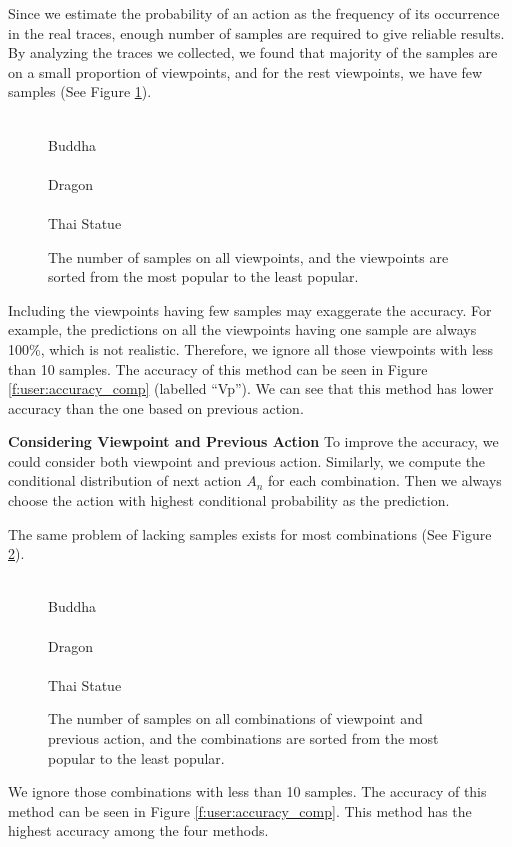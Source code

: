 Since we estimate the probability of an action as the frequency 
of its occurrence in the real traces, 
enough number of samples are required to give reliable results. 
By analyzing the traces we collected, we found that majority of the samples are 
on a small proportion of viewpoints, and for the rest viewpoints, we have few
samples (See Figure \ref{f:user:sample_size_1}).
\begin{figure}
    \centering
    \\
    Buddha\\
    \\
    Dragon\\
    \\
    Thai Statue
    \caption{The number of samples on all viewpoints, and the viewpoints are sorted from the most popular to the least popular.}
    \label{f:user:sample_size_1}
\end{figure}
Including the viewpoints having few samples may exaggerate the accuracy.
For example, the predictions on all the viewpoints having one sample are 
always 100\%, which is not realistic.
Therefore, we ignore all those viewpoints with less than 10 samples.
The accuracy of this method can be seen in Figure \ref{f:user:accuracy_comp} (labelled ``Vp'').
We can see that this method has lower accuracy than the one based on previous action.

\textbf{Considering Viewpoint and Previous Action}
To improve the accuracy, we could consider both viewpoint and previous action.
Similarly, we compute the conditional distribution of next action $A_n$ for each combination. 
Then we always choose the action with highest conditional probability as the prediction.

The same problem of lacking samples exists for most combinations (See Figure \ref{f:user:sample_size_2}).
\begin{figure}
    \centering
    \\
    Buddha\\
    \\
    Dragon\\
    \\
    Thai Statue
    \caption{The number of samples on all combinations of viewpoint and previous action, and the combinations are sorted from the most popular to the least popular.}
    \label{f:user:sample_size_2}
\end{figure}
We ignore those combinations with  less than 10 samples.
The accuracy of this method can be seen in Figure \ref{f:user:accuracy_comp}.
This method has the highest accuracy among the four methods.

